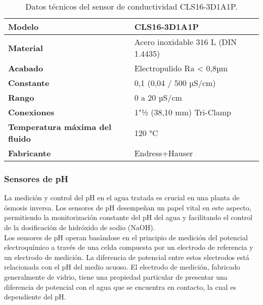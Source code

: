 \renewcommand{\arraystretch}{2}
\begin{table}[H]
    \centering
    \caption{Datos técnicos del sensor de conductividad CLS16-3D1A1P.}
    \label{table:sensorCLS16}
    \begin{tabular}{| L{6cm} | L{6cm} |}
        \hline
        \textbf{Modelo}                        & CLS16-3D1A1P                        \\
        \hline
        \textbf{Material}                      & Acero inoxidable 316 L (DIN 1.4435) \\
        \hline
        \textbf{Acabado}                       & Electropulido Ra < 0,8µm            \\
        \hline
        \textbf{Constante}                     & 0,1 (0,04 / 500 µS/cm)              \\
        \hline
        \textbf{Rango}                         & 0 a 20 µS/cm                        \\
        \hline
        \textbf{Conexiones}                    & 1"½ (38,10 mm) Tri-Clamp            \\
        \hline
        \textbf{Temperatura máxima del fluido} & 120 °C                              \\
        \hline
        \textbf{Fabricante}                    & Endress+Hauser                      \\
        \hline
    \end{tabular}
\end{table}




\subsubsection{Sensores de pH} \label{sec:sensor_ph}

La medición y control del pH en el agua tratada es crucial en una planta de ósmosis inversa. Los sensores de pH
desempeñan un papel vital en este aspecto, permitiendo la monitorización constante del pH del agua y facilitando
el control de la dosificación de hidróxido de sodio (NaOH).\\

Los sensores de pH operan basándose en el principio de medición del potencial electroquímico a través de una
celda compuesta por un electrodo de referencia y un electrodo de medición. La diferencia de potencial entre
estos electrodos está relacionada con el pH del medio acuoso. El electrodo de medición, fabricado generalmente
de vidrio, tiene una propiedad particular de presentar una diferencia de potencial con el agua que se encuentra en contacto, la cual es dependiente del pH.\\

